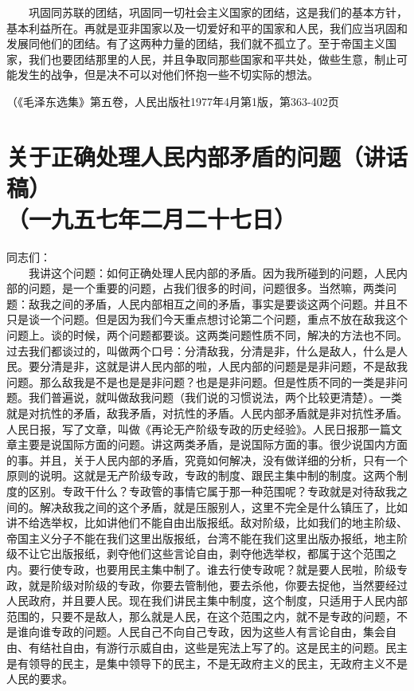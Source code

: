 \documentclass[cn,11pt,chinese]{elegantbook}
\def\myformat#1{\hfil\hfil #1}
\begin{document}
　　巩固同苏联的团结，巩固同一切社会主义国家的团结，这是我们的基本方针，基本利益所在。再就是亚非国家以及一切爱好和平的国家和人民，我们应当巩固和发展同他们的团结。有了这两种力量的团结，我们就不孤立了。至于帝国主义国家，我们也要团结那里的人民，并且争取同那些国家和平共处，做些生意，制止可能发生的战争，但是决不可以对他们怀抱一些不切实际的想法。\\
\begin{flushright}（《毛泽东选集》第五卷，人民出版社1977年4月第1版，第363-402页\end{flushright}
\newpage\section*{\myformat{关于正确处理人民内部矛盾的问题（讲话稿）}\\\myformat{（一九五七年二月二十七日）}}
同志们：\\
　　我讲这个问题：如何正确处理人民内部的矛盾。因为我所碰到的问题，人民内部的问题，是一个重要的问题，占我们很多的时间，问题很多。当然嘛，两类问题：敌我之间的矛盾，人民内部相互之间的矛盾，事实是要谈这两个问题。并且不只是谈一个问题。但是因为我们今天重点想讨论第二个问题，重点不放在敌我这个问题上。谈的时候，两个问题都要谈。这两类问题性质不同，解决的方法也不同。过去我们都谈过的，叫做两个口号：分清敌我，分清是非，什么是敌人，什么是人民。要分清是非，这就是讲人民内部的啦，人民内部的问题是是非问题，不是敌我问题。那么敌我是不是也是是非问题？也是是非问题。但是性质不同的一类是非问题。我们普遍说，就叫做敌我问题（我们说的习惯说法，两个比较更清楚）。一类就是对抗性的矛盾，敌我矛盾，对抗性的矛盾。人民内部矛盾就是非对抗性矛盾。人民日报，写了文章，叫做《再论无产阶级专政的历史经验》。人民日报那一篇文章主要是说国际方面的问题。讲这两类矛盾，是说国际方面的事。很少说国内方面的事。并且，关于人民内部的矛盾，究竟如何解决，没有做详细的分析，只有一个原则的说明。这就是无产阶级专政，专政的制度、跟民主集中制的制度。这两个制度的区别。专政干什么？专政管的事情它属于那一种范围呢？专政就是对待敌我之间的。解决敌我之间的这个矛盾，就是压服别人，这里不完全是什么镇压了，比如讲不给选举权，比如讲他们不能自由出版报纸。敌对阶级，比如我们的地主阶级、帝国主义分子不能在我们这里出版报纸，台湾不能在我们这里出版办报纸，地主阶级不让它出版报纸，剥夺他们这些言论自由，剥夺他选举权，都属于这个范围之内。要行使专政，也要用民主集中制了。谁去行使专政呢？就是要人民啦，阶级专政，就是阶级对阶级的专政，你要去管制他，要去杀他，你要去捉他，当然要经过人民政府，并且要人民。现在我们讲民主集中制度，这个制度，只适用于人民内部范围的，只要不是敌人，那么就是人民，在这个范围之内，就不是专政的问题，不是谁向谁专政的问题。人民自己不向自己专政，因为这些人有言论自由，集会自由、有结社自由，有游行示威自由，这些是宪法上写了的。这是民主的问题。民主是有领导的民主，是集中领导下的民主，不是无政府主义的民主，无政府主义不是人民的要求。\\
\end{document}
